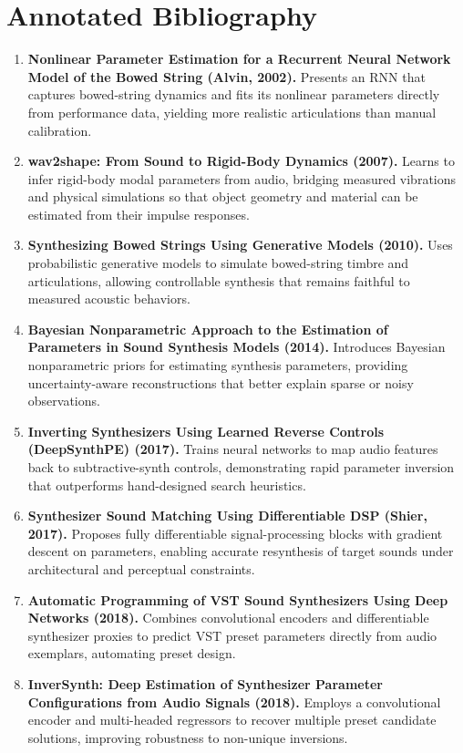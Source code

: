 \documentclass[12pt]{article}
\begin{document}
\section*{Annotated Bibliography}
\begin{enumerate}[leftmargin=*]
    \item \textbf{Nonlinear Parameter Estimation for a Recurrent Neural Network Model of the Bowed String (Alvin, 2002).} Presents an RNN that captures bowed-string dynamics and fits its nonlinear parameters directly from performance data, yielding more realistic articulations than manual calibration.
    \item \textbf{wav2shape: From Sound to Rigid-Body Dynamics (2007).} Learns to infer rigid-body modal parameters from audio, bridging measured vibrations and physical simulations so that object geometry and material can be estimated from their impulse responses.
    \item \textbf{Synthesizing Bowed Strings Using Generative Models (2010).} Uses probabilistic generative models to simulate bowed-string timbre and articulations, allowing controllable synthesis that remains faithful to measured acoustic behaviors.
    \item \textbf{Bayesian Nonparametric Approach to the Estimation of Parameters in Sound Synthesis Models (2014).} Introduces Bayesian nonparametric priors for estimating synthesis parameters, providing uncertainty-aware reconstructions that better explain sparse or noisy observations.
    \item \textbf{Inverting Synthesizers Using Learned Reverse Controls (DeepSynthPE) (2017).} Trains neural networks to map audio features back to subtractive-synth controls, demonstrating rapid parameter inversion that outperforms hand-designed search heuristics.
    \item \textbf{Synthesizer Sound Matching Using Differentiable DSP (Shier, 2017).} Proposes fully differentiable signal-processing blocks with gradient descent on parameters, enabling accurate resynthesis of target sounds under architectural and perceptual constraints.
    \item \textbf{Automatic Programming of VST Sound Synthesizers Using Deep Networks (2018).} Combines convolutional encoders and differentiable synthesizer proxies to predict VST preset parameters directly from audio exemplars, automating preset design.
    \item \textbf{InverSynth: Deep Estimation of Synthesizer Parameter Configurations from Audio Signals (2018).} Employs a convolutional encoder and multi-headed regressors to recover multiple preset candidate solutions, improving robustness to non-unique inversions.

\end{enumerate}
\end{document}
